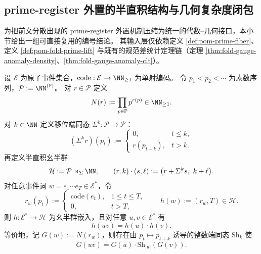 \subsection{prime-register 外置的半直积结构与几何复杂度闭包}\label{subsec:conclusion-prime-register-semidirect-godel-geometry}
为把前文分散出现的 prime-register 外置机制压缩为统一的代数--几何接口，本小节给出一组可直接复用的编号结论。
其输入层仅依赖定义 \ref{def:pom-prime-fiber}、定义 \ref{def:pom-fold-prime-lift} 与既有的规范差统计定理链（定理 \ref{thm:fold-gauge-anomaly-density}、\ref{thm:fold-gauge-anomaly-clt}）。

\begin{theorem}\label{thm:conclusion-godel-semidirect-law}
设 \(\mathcal E\) 为原子事件集合，\(\mathrm{code}:\mathcal E\hookrightarrow \NN_{\ge 1}\) 为单射编码。
令 \(p_1<p_2<\cdots\) 为素数序列，\(\mathcal P:=\NN^{(\mathbb P)}\)。
对 \(r\in\mathcal P\) 定义
\[
N(r):=\prod_{p\in\mathbb P}p^{r(p)}\in\NN_{\ge 1}.
\]
对 \(k\in\NN\) 定义移位端同态 \(\Sigma^k:\mathcal P\to\mathcal P\)：
\[
(\Sigma^k r)(p_t):=
\begin{cases}
0,&t\le k,\\
r(p_{t-k}),&t>k.
\end{cases}
\]
再定义半直积幺半群
\[
\mathcal H:=\mathcal P\rtimes_{\Sigma}\NN,\qquad
(r,k)\cdot(s,\ell):=\bigl(r+\Sigma^k s,\ k+\ell\bigr).
\]
对任意事件词 \(w=e_1\cdots e_T\in\mathcal E^\ast\)，令
\[
r_w(p_t):=
\begin{cases}
\mathrm{code}(e_t),&1\le t\le T,\\
0,&t>T,
\end{cases}
\qquad
h(w):=(r_w,T)\in\mathcal H.
\]
则 \(h:\mathcal E^\ast\to\mathcal H\) 为幺半群嵌入，且对任意 \(u,v\in\mathcal E^\ast\) 有
\[
h(uv)=h(u)\cdot h(v).
\]
等价地，记 \(G(w):=N(r_w)\)，则存在由 \(p_t\mapsto p_{t+k}\) 诱导的整数端同态 \(\mathrm{Sh}_k\) 使
\[
G(uv)=G(u)\cdot \mathrm{Sh}_{|u|}(G(v)).
\]
\end{theorem}
